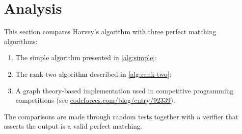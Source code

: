\section{Analysis}

This section compares Harvey's algorithm with three perfect matching algorithms:
\begin{enumerate}
   \item The simple algorithm presented in \cref{alg:simple};
   \item The rank-two algorithm described in \cref{alg:rank-two};
 \item A graph theory-based implementation used in competitive programming competitions (see \href{https://codeforces.com/blog/entry/92339}{codeforces.com/blog/entry/92339}).
\end{enumerate}
The comparisons are made through random tests together with a verifier that asserts the output is a valid perfect matching.

